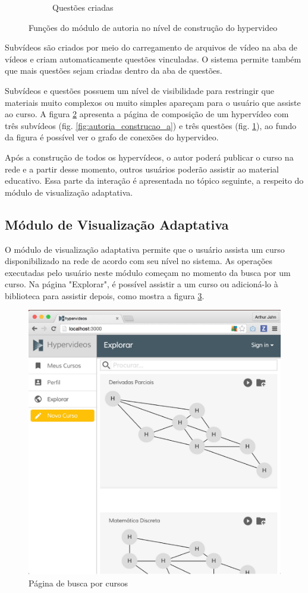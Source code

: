 \begin{figure}[h!]
\begin{subfigure}{.5\textwidth}
  		\caption{Questões criadas}
  		\label{fig:autoria_construcao_b}
	\end{subfigure}%
  	\caption{Funções do módulo de autoria no nível de construção do hypervideo}
  	\label{fig:autoria_construcao}
\end{figure}

Subvídeos são criados por meio do carregamento de arquivos de vídeo na aba de vídeos e criam automaticamente questões vinculadas. O sistema permite também que mais questões sejam criadas dentro da aba de questões. 

Subvídeos e questões possuem um nível de visibilidade para restringir que materiais muito complexos ou muito simples apareçam para o usuário que assiste ao curso. A figura \ref{fig:autoria_construcao} apresenta a página de composição de um hypervídeo com três subvídeos (fig. \ref{fig:autoria_construcao_a}) e três questões (fig. \ref{fig:autoria_construcao_b}), ao fundo da figura é possível ver o grafo de conexões do hypervideo.

Após a construção de todos os hypervídeos, o autor poderá publicar o curso na rede e a partir desse momento, outros usuários poderão assistir ao material educativo. Essa parte da interação é apresentada no tópico seguinte, a respeito do módulo de visualização adaptativa.

\subsection{Módulo de Visualização Adaptativa}

O módulo de visualização adaptativa permite que o usuário assista um curso disponibilizado na rede de acordo com seu nível no sistema. As operações executadas pelo usuário neste módulo começam no momento da busca por um curso. Na página "Explorar", é possível assistir a um curso ou adicioná-lo à biblioteca para assistir depois, como mostra a figura \ref{fig:explorar}.

\begin{figure}[h!]
  	\centering
  	\includegraphics[width=.6\linewidth]{figuras/explorar.eps}
  	\caption{Página de busca por cursos}
  	\label{fig:explorar}
\end{figure}

